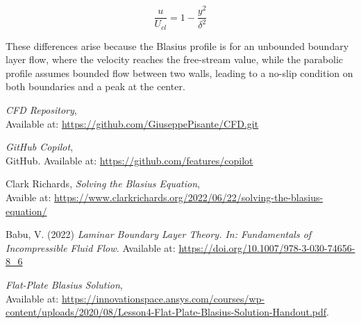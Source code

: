 \documentclass{article}
\begin{document}
\begin{equation} \label{Parabolic_profile}
    \frac{u}{U_{cl}} = 1 - \frac{y^2}{\delta^2}
\end{equation}



These differences arise because the Blasius profile is for an unbounded boundary layer flow, where the velocity reaches the free-stream value, while the parabolic profile assumes bounded flow between two walls, leading to a no-slip condition on both boundaries and a peak at the center.


\begin{thebibliography}{9}
    \textit{CFD Repository},\\
    Available at: \url{https://github.com/GiuseppePisante/CFD.git}
    
    \textit{GitHub Copilot},\\
    GitHub. Available at: \url{https://github.com/features/copilot}

     Clark Richards, 
    \textit{Solving the Blasius Equation},\\
    Avaible at: \url{https://www.clarkrichards.org/2022/06/22/solving-the-blasius-equation/}

     Babu, V. (2022)
    \textit{Laminar Boundary Layer Theory. In: Fundamentals of Incompressible Fluid Flow.}
    Available at: \url{https://doi.org/10.1007/978-3-030-74656-8_6}

    \textit{Flat-Plate Blasius Solution}, \\
    Available at: \url{https://innovationspace.ansys.com/courses/wp-content/uploads/2020/08/Lesson4-Flat-Plate-Blasius-Solution-Handout.pdf}.
    \end{thebibliography}
       
\end{document}
